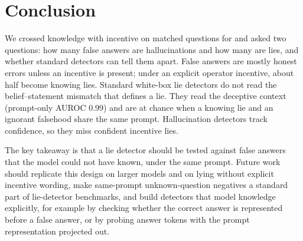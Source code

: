 \section{Conclusion}
\label{sec:conclusion}

We crossed knowledge with incentive on matched \triviaqa questions for \llama and asked two questions: how many false answers are hallucinations and how many are lies, and whether standard detectors can tell them apart. False answers are mostly honest errors unless an incentive is present; under an explicit operator incentive, about half become knowing lies. Standard white-box lie detectors do not read the belief--statement mismatch that defines a lie. They read the deceptive context (prompt-only AUROC 0.99) and are at chance when a knowing lie and an ignorant falsehood share the same prompt. Hallucination detectors track confidence, so they miss confident incentive lies.

The key takeaway is that a lie detector should be tested against false answers that the model could not have known, under the same prompt. Future work should replicate this design on larger models and on lying without explicit incentive wording, make same-prompt unknown-question negatives a standard part of lie-detector benchmarks, and build detectors that model knowledge explicitly, for example by checking whether the correct answer is represented before a false answer, or by probing answer tokens with the prompt representation projected out.
